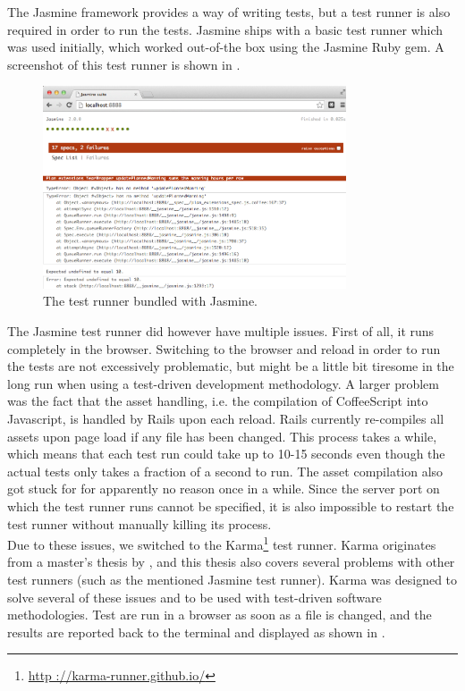 The Jasmine framework provides a way of writing tests, but a test runner
is also required in order to run the tests. Jasmine ships with a basic
test runner which was used initially, which worked out-of-the box using
the Jasmine Ruby gem. A screenshot of this test runner is shown in
.\\

\begin{figure}
\centering
\includegraphics[width=0.8\textwidth]{methodology/jasmine_runner}
\caption{The test runner bundled with Jasmine.}
\label{fig:jasmine_runner}
\end{figure}

The Jasmine test runner did however have multiple issues. First of all,
it runs completely in the browser. Switching to the browser and reload
in order to run the tests are not excessively problematic, but might be
a little bit tiresome in the long run when using a test-driven
development methodology. A larger problem was the fact that the asset
handling, i.e. the compilation of CoffeeScript into Javascript, is
handled by Rails upon each reload. Rails currently re-compiles all
assets upon page load if any file has been changed. This process takes a
while, which means that each test run could take up to 10-15 seconds
even though the actual tests only takes a fraction of a second to run.
The asset compilation also got stuck for for apparently no reason once
in a while. Since the server port on which the test runner runs cannot
be specified, it is also impossible to restart the test runner without
manually killing its process.\\

Due to these issues, we switched to the Karma\footnote{\url{http
://karma-runner.github.io/}} test runner. Karma originates from a
master's thesis by \citet{article:karma}, and this thesis also covers
several problems with other test runners (such as the mentioned Jasmine
test runner). Karma was designed to solve several of these issues and to
be used with test-driven software methodologies. Test are run in a
browser as soon as a file is changed, and the results are reported back
to the terminal and displayed as shown in .\\

